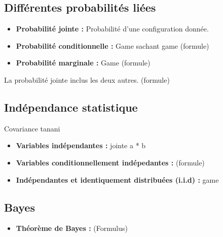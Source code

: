\documentclass{article}
\begin{document}
\subsection{Différentes probabilités liées}

\begin{itemize}

\item \textbf{Probabilité jointe :} Probabilité d'une configuration donnée. 
\item \textbf{Probabilité conditionnelle :} Game sachant game (formule) 
\item \textbf{Probabilité marginale :} Game (formule)

\end{itemize}

La probabilité jointe inclus les deux autres. (formule)

\subsection{Indépendance statistique}

Covariance tanani

\begin{itemize}

\item \textbf{Variables indépendantes :} jointe a * b
\item \textbf{Variables conditionnellement indépedantes :} (formule)

\item \textbf{Indépendantes et identiquement distribuées (i.i.d) :} game

\end{itemize}

\subsection{Bayes}

\begin{itemize}

\item \textbf{Théorème de Bayes :} (Formulus)

\end{itemize}
\end{document}
